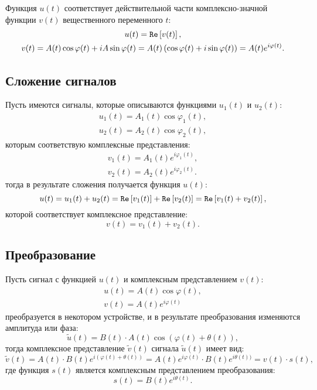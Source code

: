 Функция $u(t)$ соответствует действительной части комплексно-значной функции $v(t)$ вещественного переменного $t$:
\begin{gather*}
    u(t) = \mathtt{Re} \left [ v(t) \right ] , \\
    v(t)
    = A(t) \cos \varphi(t) + i A \sin \varphi(t)
    = A(t) \left ( \cos \varphi(t) + i \sin \varphi(t) \right )
    = A(t) e^{i \varphi(t)} .
\end{gather*}


\subsection{Сложение сигналов}

Пусть имеются сигналы, которые описываются функциями $u_1(t)$ и $u_2(t)$:
\begin{gather*}
    u_1(t) = A_1(t) \cos \varphi_1(t) , \\
    u_2(t) = A_2(t) \cos \varphi_2(t) ,
\end{gather*}
которым соответствую комплексные представления:
\begin{gather*}
    v_1(t) = A_1(t) e^{i \varphi_1(t)} , \\
    v_2(t) = A_2(t) e^{i \varphi_2(t)} .
\end{gather*}
тогда в результате сложения получается функция $u(t)$:
\[
    u(t)
    = u_1(t) + u_2(t)
    = \mathtt{Re} \left [ v_1(t) \right ] + \mathtt{Re} \left [ v_2(t) \right ]
    = \mathtt{Re} \left [ v_1(t) + v_2(t) \right ] ,
\]
которой соответствует комплексное представление:
\[
    v(t) = v_1(t) + v_2(t).
\]


\subsection{Преобразование}

Пусть сигнал с функцией $u(t)$ и комплексным представлением $v(t)$:
\begin{gather*}
    u(t) = A(t) \cos \varphi(t) , \\
    v(t) = A(t) e^{i \varphi(t)}
\end{gather*}
преобразуется в некотором устройстве, и в результате преобразования изменяются амплитуда или фаза:
\[
    \widetilde{u}(t) = B(t) \cdot A(t) \cos ( \varphi(t) + \theta(t) ) ,
\]
тогда комплексное представление $\widetilde{v}(t)$ сигнала $\widetilde{u}(t)$ имеет вид:
\[
    \widetilde{v}(t)
    = A(t) \cdot B(t) e^{i (\varphi(t) + \theta(t))}
    = A(t) e^{i \varphi(t)} \cdot B(t) e^{i \theta(t))} = v(t) \cdot s(t),
\]
где функция $s(t)$ является комплексным представлением преобразования:
\[
    s(t) = B(t) e^{i \theta(t)} .
\]


